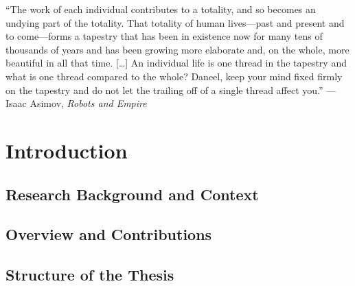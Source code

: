 \documentclass[12pt,a4paper,openright,twoside]{book}
\begin{document}
\begin{dedication} %
    ``The work of each individual contributes to a totality, and so becomes an undying part of the totality.
    That totality of human lives—past and present and to come—forms a tapestry that has been in existence now for many tens of thousands of years and has been growing more elaborate and, on the whole, more beautiful in all that time.
    [\dots] An individual life is one thread in the tapestry and what is one thread compared to the whole?
    Daneel, keep your mind fixed firmly on the tapestry and do not let the trailing off of a single thread affect you.'' --- Isaac Asimov, \emph{Robots and Empire}
\end{dedication}

\begin{acknowledgements} %

\end{acknowledgements}

\tableofcontents   
\listoffigures     %
\lstlistoflistings %

\mainmatter

\chapter{Introduction}
\label{ch:introduction}

\section{Research Background and Context}\label{sec:research-background-and-context}

\section{Overview and Contributions}\label{sec:overview-and-contributions}

\section{Structure of the Thesis}\label{sec:structure-of-the-thesis}
\end{document}
